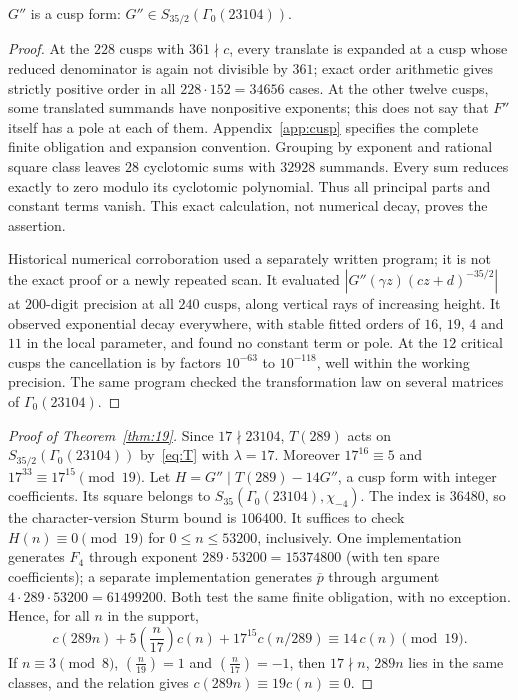 \documentclass[11pt]{article}
\theoremstyle{remark}\newtheorem{remark}[theorem]{Remark}
\newcommand{\pb}{\overline{p}}
\newcommand{\leg}[2]{\left(\frac{#1}{#2}\right)}
\begin{document}
\begin{proposition}\label{prop:cusp}
$G''$ is a cusp form: $G''\in S_{35/2}(\Gamma_0(23104))$.
\end{proposition}
\begin{proof}
At the $228$ cusps with $361\nmid c$, every translate is expanded at a cusp whose reduced denominator is again not divisible by $361$; exact order arithmetic gives strictly positive order in all $228\cdot152=34656$ cases. At the other twelve cusps, some translated summands have nonpositive exponents; this does not say that $F''$ itself has a pole at each of them. Appendix~\ref{app:cusp} specifies the complete finite obligation and expansion convention. Grouping by exponent and rational square class leaves $28$ cyclotomic sums with $32928$ summands. Every sum reduces exactly to zero modulo its cyclotomic polynomial. Thus all principal parts and constant terms vanish. This exact calculation, not numerical decay, proves the assertion.

Historical numerical corroboration used a separately written program; it is not the exact proof or a newly repeated scan. It evaluated $|G''(\gamma z)(cz+d)^{-35/2}|$ at $200$-digit precision at all $240$ cusps, along vertical rays of increasing height. It observed exponential decay everywhere, with stable fitted orders of $16$, $19$, $4$ and $11$ in the local parameter, and found no constant term or pole. At the $12$ critical cusps the cancellation is by factors $10^{-63}$ to $10^{-118}$, well within the working precision. The same program checked the transformation law on several matrices of $\Gamma_0(23104)$.
\end{proof}

\begin{proof}[Proof of Theorem~\ref{thm:19}]
Since $17\nmid23104$, $T(289)$ acts on $S_{35/2}(\Gamma_0(23104))$ by~\eqref{eq:T} with $\lambda=17$. Moreover $17^{16}\equiv5$ and $17^{33}\equiv17^{15}\pmod{19}$. Let $H=G''\mid T(289)-14G''$, a cusp form with integer coefficients. Its square belongs to $S_{35}(\Gamma_0(23104),\chi_{-4})$. The index is $36480$, so the character-version Sturm bound is $106400$. It suffices to check $H(n)\equiv0\pmod{19}$ for $0\le n\le53200$, inclusively. One implementation generates $F_4$ through exponent $289\cdot53200=15374800$ (with ten spare coefficients); a separate implementation generates $\pb$ through argument $4\cdot289\cdot53200=61499200$. Both test the same finite obligation, with no exception. Hence, for all $n$ in the support,
\[c(289n)+5\leg n{17}c(n)+17^{15}c(n/289)\equiv14\,c(n)\pmod{19}.\]
If $n\equiv3\pmod8$, $\leg n{19}=1$ and $\leg n{17}=-1$, then $17\nmid n$, $289n$ lies in the same classes, and the relation gives $c(289n)\equiv19c(n)\equiv0$.
\end{proof}
\end{document}
